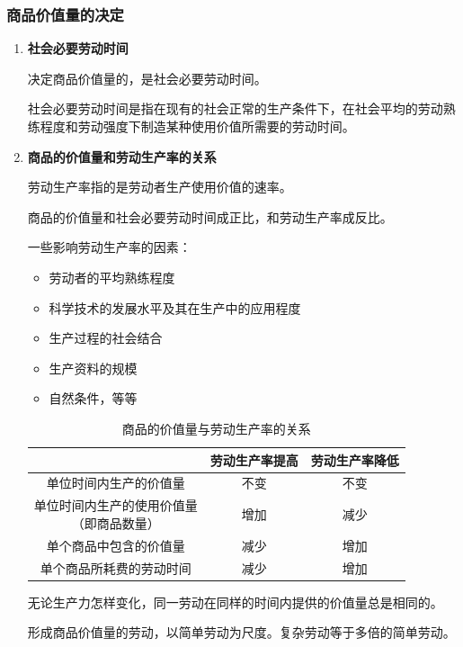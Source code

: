 \documentclass[12pt, a4paper, oneside]{ctexart}
\begin{document}
\subsubsection{商品价值量的决定}

\begin{enumerate}
  \item {\bf 社会必要劳动时间}
  
  决定商品价值量的，是社会必要劳动时间。

  社会必要劳动时间是指在现有的社会正常的生产条件下，在社会平均的劳动熟练程度和劳动强度下制造某种使用价值所需要的劳动时间。

  \item {\bf 商品的价值量和劳动生产率的关系}
  
  劳动生产率指的是劳动者生产使用价值的速率。

  商品的价值量和社会必要劳动时间成正比，和劳动生产率成反比。

  一些影响劳动生产率的因素：
  \begin{itemize}
    \item 劳动者的平均熟练程度
    \item 科学技术的发展水平及其在生产中的应用程度
    \item 生产过程的社会结合
    \item 生产资料的规模
    \item 自然条件，等等
  \end{itemize}

  \begin{table}[h]
    \centering
    \caption{商品的价值量与劳动生产率的关系}
    \begin{tabular}{|c|c|c|}
      \hline
      & 劳动生产率提高 & 劳动生产率降低 \\ \hline
      单位时间内生产的价值量 & 不变 & 不变 \\ \hline
      \makecell[c]{单位时间内生产的使用价值量\\ （即商品数量）} & 增加 & 减少 \\ \hline
      单个商品中包含的价值量 & 减少 & 增加\\ \hline
      单个商品所耗费的劳动时间 & 减少 & 增加 \\
      \hline
    \end{tabular}
  \end{table}

  无论生产力怎样变化，同一劳动在同样的时间内提供的价值量总是相同的。

  形成商品价值量的劳动，以简单劳动为尺度。复杂劳动等于多倍的简单劳动。
\end{enumerate}
\end{document}
